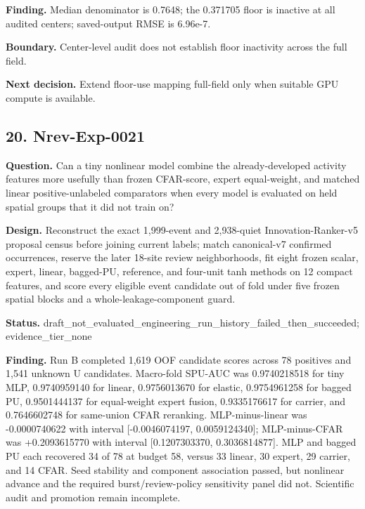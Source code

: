 \textbf{Finding.} Median denominator is 0.7648; the 0.371705 floor is inactive at all audited centers; saved-output RMSE is 6.96e-7.

\textbf{Boundary.} Center-level audit does not establish floor inactivity across the full field.

\textbf{Next decision.} Extend floor-use mapping full-field only when suitable GPU compute is available.

\subsection{20. Nrev-Exp-0021}

\textbf{Question.} Can a tiny nonlinear model combine the already-developed activity features more usefully than frozen CFAR-score, expert equal-weight, and matched linear positive-unlabeled comparators when every model is evaluated on held spatial groups that it did not train on?

\textbf{Design.} Reconstruct the exact 1,999-event and 2,938-quiet Innovation-Ranker-v5 proposal census before joining current labels; match canonical-v7 confirmed occurrences, reserve the later 18-site review neighborhoods, fit eight frozen scalar, expert, linear, bagged-PU, reference, and four-unit tanh methods on 12 compact features, and score every eligible event candidate out of fold under five frozen spatial blocks and a whole-leakage-component guard.

\textbf{Status.} draft\_not\_evaluated\_engineering\_run\_history\_failed\_then\_succeeded; evidence\_tier\_none

\textbf{Finding.} Run B completed 1,619 OOF candidate scores across 78 positives and 1,541 unknown U candidates. Macro-fold SPU-AUC was 0.9740218518 for tiny MLP, 0.9740959140 for linear, 0.9756013670 for elastic, 0.9754961258 for bagged PU, 0.9501444137 for equal-weight expert fusion, 0.9335176617 for carrier, and 0.7646602748 for same-union CFAR reranking. MLP-minus-linear was -0.0000740622 with interval [-0.0046074197, 0.0059124340]; MLP-minus-CFAR was +0.2093615770 with interval [0.1207303370, 0.3036814877]. MLP and bagged PU each recovered 34 of 78 at budget 58, versus 33 linear, 30 expert, 29 carrier, and 14 CFAR. Seed stability and component association passed, but nonlinear advance and the required burst/review-policy sensitivity panel did not. Scientific audit and promotion remain incomplete.

